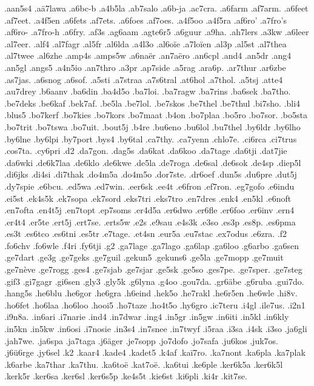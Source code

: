 .aan5s4
.aä7lawa
.a6bc-b
.a4b5la
.ab7salo
.a6b-ja
.ac7cra.
.a6farm
.af7arm.
.a6feet
.af7eet.
.a4f5en
.a6fets
.af7ets.
.a6foes
.af7oes.
.a4f5oo
.a4f5ra
.af6ro'
.a7fro's
.af6ro-
.a7fro-h
.a6fry.
.af3s
.ag6aam
.agte6r5
.a6guur
.a9ha.
.ah7lers
.a3kw
.a6leer
.al7eer.
.alf4
.al7fagr
.al5fr
.al6lda
.a4l3o
.al6oïe
.a7loïen
.al3p
.al5st
.al7thea
.al7twee
.al6zhe
.amp4s
.amps5w
.a6naër
.an7aëro
.an6cpl
.and4
.an5dr
.ang4
.an5gl
.angs5
.a4n5io
.an7thro
.a3pr
.ap7side
.a5rag
.ara6p.
.ar7thur
.ar6zbe
.as7jas.
.a6snog
.a6sof.
.a5sti
.a7straa
.a7s6tral
.at6hol
.a7thol.
.a5tsj
.atte4
.au7drey
.b6aanv
.ba6din
.ba4d5o
.ba7loi.
.ba7ragw
.ba7rins
.ba6sek
.ba7tho.
.be7deks
.be6kaf
.bek7af.
.be5la
.be7lol.
.be7skos
.be7thel
.be7thul
.bi7sho.
.bli4
.blus5
.bo7kerf
.bo7kies
.bo7kors
.bo7maat
.b4on
.bo7plaa
.bo5ro
.bo7sor.
.bo5sta
.bo7trit
.bo7tswa
.bo7uit.
.bout5j
.b4re
.bu6eno
.bu6lol
.bu7thel
.by6ldr
.by6lho
.by6lne
.by6lpi
.by7port
.bys4
.by6tal
.ca7thy.
.ca7yenn
.chlo7e.
.ci6rca
.ci7trus
.cos7ta.
.cy6pri
.d2
.da7gon.
.dag5s
.da6kat
.da6koo
.da7tage
.da6tji
.dat7jie
.da6wki
.de6k7laa
.de6klo
.de6kwe
.de5la
.de7roga
.de6sal
.de6sok
.de4sp
.diep5l
.di6jks
.di4si
.di7thak
.do4m5a
.do4m5o
.dor7ste.
.dr6oef
.dun5s
.du6pre
.dut5j
.dy7spie
.e6bcu.
.ed5wa
.ed7win.
.eer6sk
.ee4t
.e6fron
.ef7ron.
.eg7gofo
.e6indu
.ei5st
.ek4s5k
.ek7sopa
.ek7sord
.eks7tri
.eks7tro
.en7dres
.enk4
.en5kl
.e6noft
.en7ofta
.en4t5j
.en7topt
.ep7soms
.er4d5a
.er6dwo
.er6fle
.er6foo
.er6inv
.ern4
.er4t4
.er5te
.ert5j
.ert7se.
.erts5w
.e2s
.e9sau
.e4s3k
.e3so
.es3p
.es8p.
.es6pma
.es3t
.es6tco
.es6tni
.es5tr
.e7tage.
.et4sn
.eur5a
.eu7stac
.ex7odus
.e6zra.
.f2
.fo6chv
.fo6wle
.f4ri
.fy6tji
.g2
.ga7lage
.ga7lago
.ga6lap
.ga6loo
.g6arbo
.ga6sen
.ge7dart
.ge3g
.ge7geks
.ge7guil
.gekun5
.gekuns6
.ge5la
.ge7mopp
.ge7muit
.ge7nève
.ge7rogg
.ges4
.ge7sjab
.ge7sjar
.ge5sk
.ge5so
.ges7pe.
.ge7sper.
.ge7steg
.gif3
.gi7gagr
.gi6sen
.gly3
.gly5k
.g6lyna
.g4oo
.gou7da.
.gr6äbe
.g6ruba
.gui7do.
.hang5s
.he6blu
.he6gor
.he6gra
.h6eind
.hek5o
.he7rakl
.he6r5en
.he6wle
.hi8v.
.ho6fet
.ho6laa
.ho6loo
.hooi5
.ho7taze
.ho4t5o
.hy6gro
.ic7teru
.i4gl
.ile7us.
.i2n1
.i9n8a.
.in6ari
.i7narie
.ind4
.in7dwar
.ing4
.in5gr
.in5gw
.in6iti
.in5kl
.in6kly
.in5kn
.in5kw
.in6osi
.i7nosie
.in3s4
.in7snee
.in7twyf
.i5raa
.i3sa
.i4sk
.i3so
.ja6gli
.jah7we.
.ja6spa
.ja7taga
.j6äger
.je7sopp
.jo7dofo
.jo7safa
.ju6kos
.juk7os.
.j6ü6rge
.jy6sel
.k2
.kaar4
.kade4
.kadet5
.k4af
.kaï7ro.
.ka7nont
.ka6pla
.ka7plak
.k6arbe
.ka7thar
.ka7thu.
.ka6toë
.kat7oë.
.ka6tui
.ke6ple
.ker6k5a
.ker6k5l
.kerk5r
.ker6sa
.ker6sl
.ker6s5p
.ke4s5t
.kie6st
.ki6pli
.ki4r
.kit7se.

